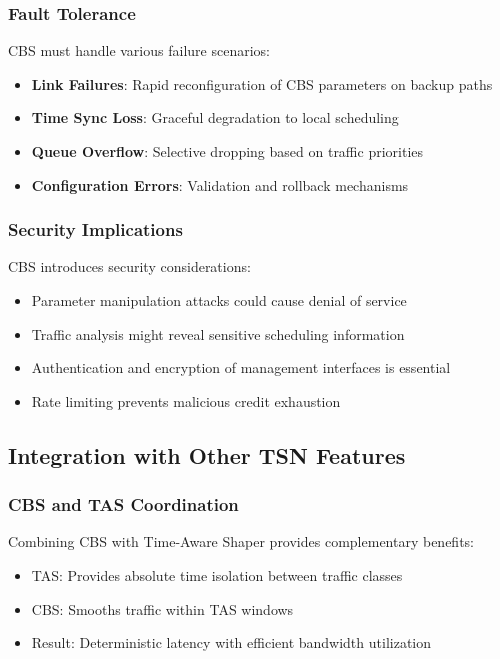 \documentclass[10pt, journal, compsoc]{IEEEtran}
\begin{document}
\subsubsection{Fault Tolerance}

CBS must handle various failure scenarios:

\begin{itemize}
    \item \textbf{Link Failures}: Rapid reconfiguration of CBS parameters on backup paths
    \item \textbf{Time Sync Loss}: Graceful degradation to local scheduling
    \item \textbf{Queue Overflow}: Selective dropping based on traffic priorities
    \item \textbf{Configuration Errors}: Validation and rollback mechanisms
\end{itemize}

\subsubsection{Security Implications}

CBS introduces security considerations:

\begin{itemize}
    \item Parameter manipulation attacks could cause denial of service
    \item Traffic analysis might reveal sensitive scheduling information
    \item Authentication and encryption of management interfaces is essential
    \item Rate limiting prevents malicious credit exhaustion
\end{itemize}

\subsection{Integration with Other TSN Features}

\subsubsection{CBS and TAS Coordination}

Combining CBS with Time-Aware Shaper provides complementary benefits:
\begin{itemize}
    \item TAS: Provides absolute time isolation between traffic classes
    \item CBS: Smooths traffic within TAS windows
    \item Result: Deterministic latency with efficient bandwidth utilization
\end{itemize}
\end{document}
